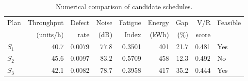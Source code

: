 \begin{table}[htbp]
\centering
\caption{Numerical comparison of candidate schedules.}
\label{tab:numerical-sim}
\small
\begin{tabular}{@{}lrrrrrrrl@{}}
\toprule
Plan & Throughput & Defect & Noise & Fatigue & Energy & Gap & V/R & Feasible \\
     & (units/h)  & rate   & (dB)  & Index   & (kWh)  & (\%) & score &         \\
\midrule
$S_{1}$ & 40.7 & 0.0079 & 77.8 & 0.3501 & 401 & 21.7 & 0.481 & Yes \\
$S_{2}$ & 45.6 & 0.0097 & 83.2 & 0.5709 & 458 & 12.3 & 0.492 & No \\
$S_{3}$ & 42.1 & 0.0082 & 78.7 & 0.3958 & 417 & 35.2 & 0.444 & Yes \\
\bottomrule
\end{tabular}
\end{table}
